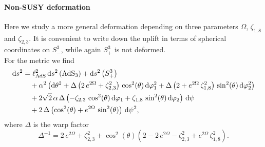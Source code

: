 \documentclass[a4paper, 11pt]{article}
\numberwithin{equation}{section}
\newcommand{\+}{\oplus}
\renewcommand{\d}{\ensuremath{\mathrm{d}}\xspace}
\begin{document}
\paragraph{Non-SUSY deformation}
Here we study a more general deformation depending on three parameters $\Omega$, $\zeta_{1,8}$ and $\zeta_{2,3}$. It is convenient to write down the uplift in terms of spherical coordinates on $S_-^3$, while again $S_+^3$ is not deformed.\\
\noindent For the metric we find
\begin{equation}
	\begin{aligned}
		\d s^{2} &= \ell_{\rm AdS}^{2} \,\d s^2\left({\rm AdS}_{3}\right)+\d s^2\left(S^{3}_{+}\right) \\
		&\quad + \alpha^{2}\left(\d\theta^{2}+\Delta\left(2\,e^{2\Omega}+\zeta_{2,3}^{2}\right)\,\cos^{2}(\theta)\,\d\varphi^{2}_{1}+\Delta\left(2+e^{2\Omega}\,\zeta_{1,8}^{2}\right)\,\sin^{2}(\theta)\,\d\varphi_{2}^{2}\right)\\
		&\quad+2\sqrt{2}\,\alpha\,\Delta\left(-\zeta_{2,3}\,\cos^{2}(\theta)\,\d\varphi_{1}+\zeta_{1,8}\,\sin^{2}(\theta)\,\d\varphi_{2}\right)\,\d\psi \\
		&\quad+2\,\Delta\left(\cos^{2}(\theta)+e^{2\Omega}\,\sin^{2}(\theta)\right)\,\d\psi^{2},
	\end{aligned}
\end{equation}
where $\Delta$ is the warp factor
\begin{equation}
		\Delta^{-1} = 2\,e^{2\Omega}+\zeta_{2,3}^{2}+\cos^{2}(\theta)\left(2-2\,e^{2\Omega}-\zeta_{2,3}^{2}+e^{2\Omega}\,\zeta_{1,8}^{2}\right).
\end{equation}
\end{document}
